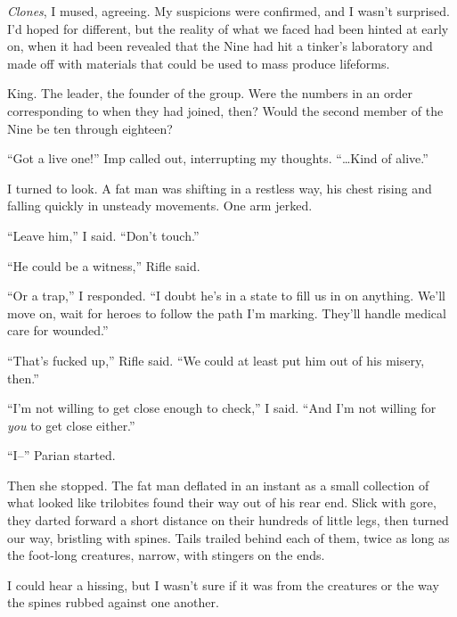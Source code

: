 \emph{Clones}, I mused, agreeing.  My suspicions were confirmed, and I wasn't surprised.  I'd hoped for different, but the reality of what we faced had been hinted at early on, when it had been revealed that the Nine had hit a tinker's laboratory and made off with materials that could be used to mass produce lifeforms.



King.  The leader, the founder of the group.  Were the numbers in an order corresponding to when they had joined, then?  Would the second member of the Nine be ten through eighteen?



``Got a live one!''  Imp called out, interrupting my thoughts.  ``\ldots{}Kind of alive.''



I turned to look.  A fat man was shifting in a restless way, his chest rising and falling quickly in unsteady movements.  One arm jerked.



``Leave him,'' I said.  ``Don't touch.''



``He could be a witness,'' Rifle said.



``Or a trap,'' I responded.  ``I doubt he's in a state to fill us in on anything.  We'll move on, wait for heroes to follow the path I'm marking.  They'll handle medical care for wounded.''



``That's fucked up,'' Rifle said.  ``We could at least put him out of his misery, then.''



``I'm not willing to get close enough to check,'' I said.  ``And I'm not willing for \emph{you} to get close either.''



``I--'' Parian started.



Then she stopped.  The fat man deflated in an instant as a small collection of what looked like trilobites found their way out of his rear end.  Slick with gore, they darted forward a short distance on their hundreds of little legs, then turned our way, bristling with spines.  Tails trailed behind each of them, twice as long as the foot-long creatures, narrow, with stingers on the ends.



I could hear a hissing, but I wasn't sure if it was from the creatures or the way the spines rubbed against one another.



